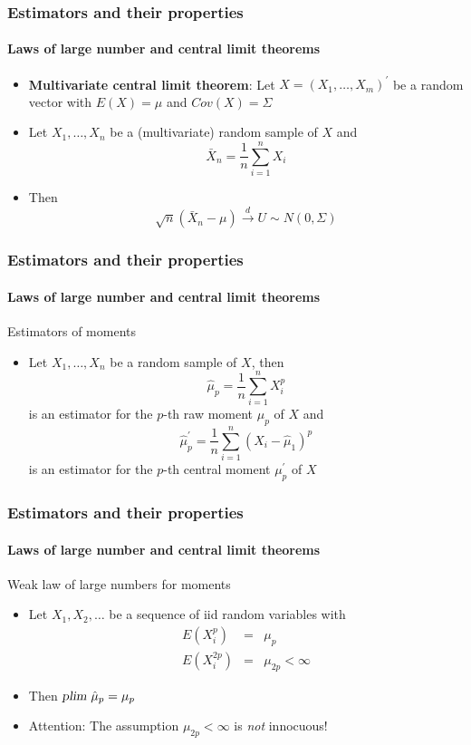\documentclass[notes=show]{beamer}
\begin{document}
\begin{frame}\frametitle{Estimators and their properties}\framesubtitle{Laws of large number and central limit theorems}
\begin{itemize}
    \item \textbf{Multivariate central limit theorem}: Let $X=(X_{1},\ldots,X_{m})^{\prime }$ be a random vector with $E(X)=\mu $ and $Cov(X)=\Sigma $
    \item Let $X_{1},\ldots ,X_{n}$ be a (multivariate) random sample of $X$ and
    \begin{equation*}
        \bar{X}_{n}=\frac{1}{n}\sum_{i=1}^{n}X_{i}
    \end{equation*}
    \item Then
    \begin{equation*}
        \sqrt{n}\left( \bar{X}_{n}-\mu \right) \overset{d}{\rightarrow }U\sim N(0,\Sigma )
    \end{equation*}
\end{itemize}
\end{frame}


\begin{frame}\frametitle{Estimators and their properties}\framesubtitle{Laws of large number and central limit theorems}
Estimators of moments
\begin{itemize}
    \item Let $X_{1},\ldots ,X_{n}$ be a random sample of $X$, then
    \begin{equation*}
        \hat{\mu}_{p}=\frac{1}{n}\sum_{i=1}^{n}X_{i}^{p}
    \end{equation*}
    is an estimator for the $p$-th raw moment $\mu _{p}$ of $X$ and
    \begin{equation*}
        \hat{\mu}_{p}^{\prime }=\frac{1}{n}\sum_{i=1}^{n}\left( X_{i}-\hat{\mu}_{1}\right) ^{p}
    \end{equation*}
    is an estimator for the $p$-th central moment $\mu _{p}^{\prime }$ of $X$
\end{itemize}
\end{frame}


\begin{frame}\frametitle{Estimators and their properties}\framesubtitle{Laws of large number and central limit theorems}
Weak law of large numbers for moments
\begin{itemize}
    \item Let $X_{1},X_{2},\ldots $ be a sequence of iid random variables with
    \begin{eqnarray*}
        E(X_{i}^{p}) &=&\mu _{p} \\
        E(X_{i}^{2p}) &=&\mu _{2p}<\infty
    \end{eqnarray*}
    \item Then $\textsl{plim}~\hat{\mu}_{p}=\mu _{p}$
    \item Attention: The assumption $\mu _{2p}<\infty $ is \emph{not} innocuous!
\end{itemize}
\end{frame}
\end{document}
